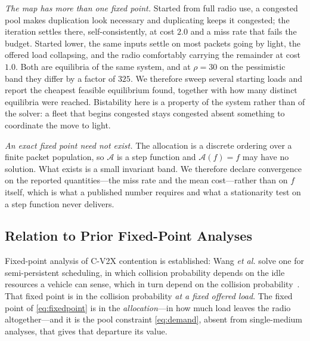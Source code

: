 \emph{The map has more than one fixed point.} Started from full radio use, a
congested pool makes duplication look necessary and duplicating keeps it
congested; the iteration settles there, self-consistently, at cost $2.0$ and a
miss rate that fails the budget. Started lower, the same inputs settle on most
packets going by light, the offered load collapsing, and the radio comfortably
carrying the remainder at cost $1.0$. Both are equilibria of the same system,
and at $\rho = 30$ on the pessimistic band they differ by a factor of $325$. We
therefore sweep several starting loads and report the cheapest feasible
equilibrium found, together with how many distinct equilibria were reached.
Bistability here is a property of the system rather than of the solver: a fleet
that begins congested stays congested absent something to coordinate the move
to light.

\emph{An exact fixed point need not exist.} The allocation is a discrete
ordering over a finite packet population, so $\mathcal{A}$ is a step function
and $\mathcal{A}(f) = f$ may have no solution. What exists is a small invariant
band. We therefore declare convergence on the reported quantities---the miss
rate and the mean cost---rather than on $f$ itself, which is what a published
number requires and what a stationarity test on a step function never delivers.

\subsection{Relation to Prior Fixed-Point Analyses}

Fixed-point analysis of C-V2X contention is established: Wang \emph{et al.}
solve one for semi-persistent scheduling, in which collision probability
depends on the idle resources a vehicle can sense, which in turn depend on the
collision probability~\cite{wang2018fixedpoint}. That fixed point is in the
collision probability \emph{at a fixed offered load}. The fixed point of
\eqref{eq:fixedpoint} is in the \emph{allocation}---in how much load leaves the
radio altogether---and it is the pool constraint \eqref{eq:demand}, absent from
single-medium analyses, that gives that departure its value.
